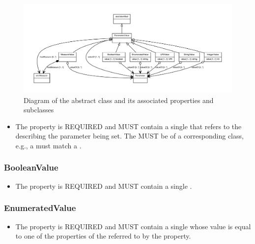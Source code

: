 \begin{figure}[ht]
\begin{center}
\includegraphics[scale=0.6]{figures/ParameterValue_definition_and_abstraction}
\caption[]{Diagram of the  abstract class and its associated properties and subclasses}
\label{uml:ParameterValue}
\end{center}
\end{figure}


\begin{itemize}
\item \label{sec:valueOf}
The  property is REQUIRED and MUST contain a single  that refers to the  describing the parameter being set.
The  MUST be of a corresponding class, e.g., a  must match a .
\end{itemize}


\subsubsection{BooleanValue}
\label{sec:BooleanValue}

\begin{itemize}
\item \label{sec:BP:value}
The  property is REQUIRED and MUST contain a single .
\end{itemize}

\subsubsection{EnumeratedValue}
\label{sec:EnumeratedValue}

\begin{itemize}
\item \label{sec:EV:value}
The  property is REQUIRED and MUST contain a single  whose value is equal to one of the  properties of the  referred to by the  property.
\end{itemize}



